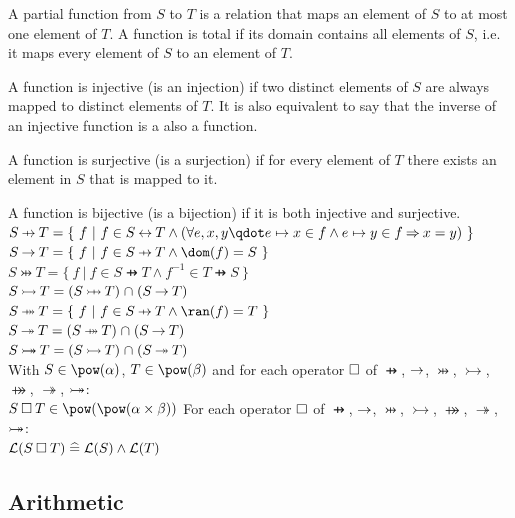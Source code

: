 \begin{rodinrefentry}
  \rrdesc
  A partial function from $S$ to $T$ is a relation that maps an element of $S$ to at most one element
  of $T$. A function is total if its domain contains all elements of $S$, i.e. it maps every element
  of $S$ to an element of $T$.

  A function is injective (is an injection) if two distinct elements of $S$ are always mapped to distinct
  elements of $T$. It is also equivalent to say that the inverse of an injective function is a also a function.

  A function is surjective (is a surjection) if for every element of $T$ there exists an element in $S$
  that is mapped to it.

  A function is bijective (is a bijection) if it is both injective and surjective.
  \rrdef
  $S \pfun T = \{~ f ~|~ f\in S\rel T \land (\forall e,x,y \qdot e\mapsto x\in f \land e\mapsto y\in f \limp x=y) ~\}$\\
  $S \tfun T = \{~ f ~|~ f\in S\pfun T \land \dom(f) = S ~\}$\\
  $S \pinj T = \{~ f ~|~ f\in S\pfun T \land f^{-1} \in  T\pfun S ~\}$\\
  $S \tinj T = (S\pinj T) \binter (S\tfun T)$\\
  $S \psur T = \{~ f ~|~ f\in S\pfun T \land \ran(f) = T ~\}$\\
  $S \tsur T = (S\psur T) \binter (S\tfun T)$\\
  $S \mathbin{ \rightarrowtail \mkern-18mu\twoheadrightarrow} T = (S\mathbin\rightarrowtail T) \mathbin{\mkern1mu\cap\mkern1mu} (S\mathbin\twoheadrightarrow T)$\\
  \rrtypes
  With $S\in\pow(\alpha)$, $T\in\pow(\beta)$ and for each operator $\mathbin{\Box}$ of $\pfun$, $\mathbin\rightarrow$, $\pinj$, $\tinj$, $\psur$, $\tsur$, $\mathbin{ \rightarrowtail \mkern-18mu\twoheadrightarrow}$:\\
  $S \opelipse T \in \pow(\pow(\alpha\cprod\beta))$
  \rrwd
  For each operator $\mathbin{\Box}$ of $\pfun$, $\mathbin\rightarrow$, $\pinj$, $\tinj$, $\psur$, $\tsur$, $\mathbin{ \rightarrowtail \mkern-18mu\twoheadrightarrow}$:\\
  $\mathcal{L}(S\mathbin{\Box} T) \mathrel{\widehat=} \mathcal{L}(S) \land \mathcal{L}(T)$
\end{rodinrefentry}


\subsection{Arithmetic}

